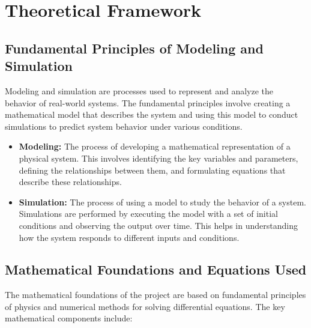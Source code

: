 \chapter{Theoretical Framework}

\section{Fundamental Principles of Modeling and Simulation}

Modeling and simulation are processes used to represent and analyze the behavior of real-world systems. The fundamental principles involve creating a mathematical model that describes the system and using this model to conduct simulations to predict system behavior under various conditions.

\begin{itemize}
    \item \textbf{Modeling:} The process of developing a mathematical representation of a physical system. This involves identifying the key variables and parameters, defining the relationships between them, and formulating equations that describe these relationships.
    \item \textbf{Simulation:} The process of using a model to study the behavior of a system. Simulations are performed by executing the model with a set of initial conditions and observing the output over time. This helps in understanding how the system responds to different inputs and conditions.
\end{itemize}

\section{Mathematical Foundations and Equations Used}

The mathematical foundations of the project are based on fundamental principles of physics and numerical methods for solving differential equations. The key mathematical components include:

